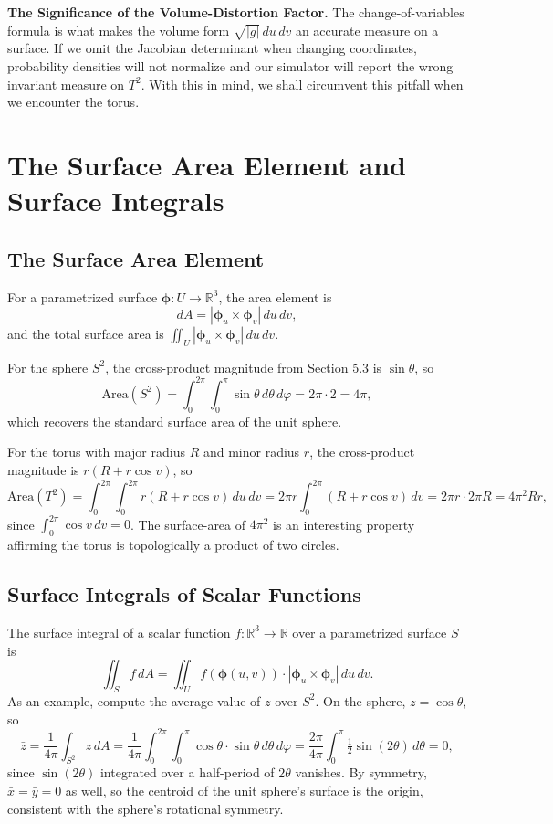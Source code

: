 \documentclass{article}
\begin{document}
\textbf{The Significance of the Volume-Distortion Factor.} The change-of-variables formula is what makes the volume form $\sqrt{|g|}\, du\, dv$ an accurate measure on a surface. If we omit the Jacobian determinant when  changing coordinates, probability densities will not normalize and our simulator will report the wrong invariant measure on $T^2$. With this in mind, we shall circumvent this pitfall when we encounter the torus.
 
\section{The Surface Area Element and Surface Integrals}
  
\subsection{The Surface Area Element}
 
For a parametrized surface $\boldsymbol{\phi}: U \to \mathbb{R}^3$, the area element is
$$dA = |\boldsymbol{\phi}_u \times \boldsymbol{\phi}_v|\, du\, dv,$$
and the total surface area is $\iint_U |\boldsymbol{\phi}_u \times \boldsymbol{\phi}_v|\, du\, dv$.
 
For the sphere $S^2$, the cross-product magnitude from Section 5.3 is $\sin\theta$, so
$$\text{Area}(S^2) = \int_0^{2\pi}\!\!\int_0^\pi \sin\theta\, d\theta\, d\varphi = 2\pi \cdot 2 = 4\pi,$$
which recovers the standard surface area of the unit sphere.
 
For the torus with major radius $R$ and minor radius $r$, the cross-product magnitude is $r(R + r\cos v)$, so
$$\text{Area}(T^2) = \int_0^{2\pi}\!\!\int_0^{2\pi} r(R + r\cos v)\, du\, dv = 2\pi r \int_0^{2\pi}(R + r\cos v)\, dv = 2\pi r \cdot 2\pi R = 4\pi^2 R r,$$
since $\int_0^{2\pi}\cos v\, dv = 0$. The surface-area of $4\pi^2$ is an interesting property affirming the torus is topologically a product of two circles.
 
\subsection{Surface Integrals of Scalar Functions}
 
The surface integral of a scalar function $f: \mathbb{R}^3 \to \mathbb{R}$ over a parametrized surface $S$ is
$$\iint_S f\, dA = \iint_U f(\boldsymbol{\phi}(u, v)) \cdot |\boldsymbol{\phi}_u \times \boldsymbol{\phi}_v|\, du\, dv.$$
As an example, compute the average value of $z$ over $S^2$. On the sphere, $z = \cos\theta$, so
$$\bar{z} = \frac{1}{4\pi}\int_{S^2} z\, dA = \frac{1}{4\pi}\int_0^{2\pi}\!\!\int_0^\pi \cos\theta \cdot \sin\theta\, d\theta\, d\varphi = \frac{2\pi}{4\pi}\int_0^\pi \tfrac{1}{2}\sin(2\theta)\, d\theta = 0,$$
since $\sin(2\theta)$ integrated over a half-period of $2\theta$ vanishes. By symmetry, $\bar{x} = \bar{y} = 0$ as well, so the centroid of the unit sphere's surface is the origin, consistent with the sphere's rotational symmetry.
 
\end{document}
